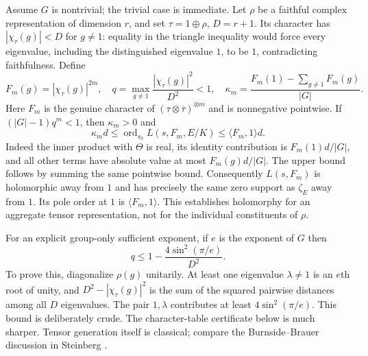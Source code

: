 Assume $G$ is nontrivial; the trivial case is immediate.
Let $\rho$ be a faithful complex representation of dimension $r$, and set
$\tau=1\oplus\rho$, $D=r+1$. Its character has
$|\chi_\tau(g)|<D$ for $g\ne1$: equality in the triangle inequality would
force every eigenvalue, including the distinguished eigenvalue $1$, to be
$1$, contradicting faithfulness. Define
\[
 F_m(g)=|\chi_\tau(g)|^{2m},\quad
 q=\max_{g\ne1}\frac{|\chi_\tau(g)|^2}{D^2}<1,
 \quad
 \kappa_m=\frac{F_m(1)-\sum_{g\ne1}F_m(g)}{|G|}.
\]
Here $F_m$ is the genuine character of
$(\tau\otimes\overline\tau)^{\otimes m}$ and is nonnegative pointwise.
If $(|G|-1)q^m<1$, then $\kappa_m>0$ and
\begin{equation}\label{eq:generic-tensor-domination}
 \kappa_m d\le\operatorname{ord}_{s_0}L(s,F_m,E/K)
 \le\langle F_m,1\rangle d.
\end{equation}
Indeed the inner product with $\Theta$ is real, its identity contribution is
$F_m(1)d/|G|$, and all other terms have absolute value at most
$F_m(g)d/|G|$. The upper bound follows by summing the same pointwise bound.
Consequently $L(s,F_m)$ is holomorphic away from $1$ and has precisely the
same zero support as $\zeta_E$ away from $1$. Its pole order at $1$ is
$\langle F_m,1\rangle$. This establishes holomorphy for an aggregate tensor
representation, not for the individual constituents of $\rho$.

For an explicit group-only sufficient exponent, if $e$ is the exponent of
$G$ then
\[
 q\le1-\frac{4\sin^2(\pi/e)}{D^2}.
\]
To prove this, diagonalize $\rho(g)$ unitarily. At least one eigenvalue
$\lambda\ne1$ is an $e$th root of unity, and
$D^2-|\chi_\tau(g)|^2$ is the sum of the squared pairwise distances among
all $D$ eigenvalues. The pair $1,\lambda$ contributes at least
$4\sin^2(\pi/e)$. This bound is deliberately crude. The character-table
certificate below is much sharper. Tensor generation itself is classical;
compare the Burnside--Brauer discussion in Steinberg \cite{steinberg}.

